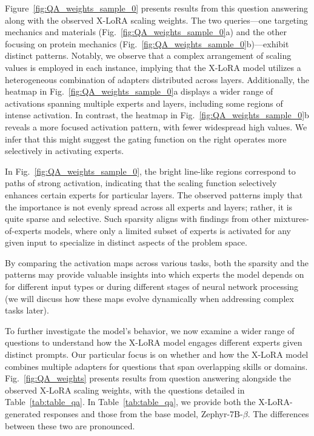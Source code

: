 Figure~\ref{fig:QA_weights_sample_0} presents results from this question answering along with the observed X-LoRA scaling weights. The two queries—one targeting mechanics and materials (Fig.~\ref{fig:QA_weights_sample_0}a) and the other focusing on protein mechanics (Fig.~\ref{fig:QA_weights_sample_0}b)—exhibit distinct patterns. Notably, we observe that a complex arrangement of scaling values is employed in each instance, implying that the X-LoRA model utilizes a heterogeneous combination of adapters distributed across layers. Additionally, the heatmap in Fig.~\ref{fig:QA_weights_sample_0}a displays a wider range of activations spanning multiple experts and layers, including some regions of intense activation. In contrast, the heatmap in Fig.~\ref{fig:QA_weights_sample_0}b reveals a more focused activation pattern, with fewer widespread high values. We infer that this might suggest the gating function on the right operates more selectively in activating experts.

In Fig.~\ref{fig:QA_weights_sample_0}, the bright line-like regions correspond to paths of strong activation, indicating that the scaling function selectively enhances certain experts for particular layers. The observed patterns imply that the importance is not evenly spread across all experts and layers; rather, it is quite sparse and selective. Such sparsity aligns with findings from other mixtures-of-experts models, where only a limited subset of experts is activated for any given input to specialize in distinct aspects of the problem space.

By comparing the activation maps across various tasks, both the sparsity and the patterns may provide valuable insights into which experts the model depends on for different input types or during different stages of neural network processing (we will discuss how these maps evolve dynamically when addressing complex tasks later). 

To further investigate the model’s behavior, we now examine a wider range of questions to understand how the X-LoRA model engages different experts given distinct prompts. Our particular focus is on whether and how the X-LoRA model combines multiple adapters for questions that span overlapping skills or domains. Fig.~\ref{fig:QA_weights} presents results from question answering alongside the observed X-LoRA scaling weights, with the questions detailed in Table~\ref{tab:table_qa}. In Table~\ref{tab:table_qa}, we provide both the X-LoRA-generated responses and those from the base model, Zephyr-7B-$\beta$. The differences between these two are pronounced.

